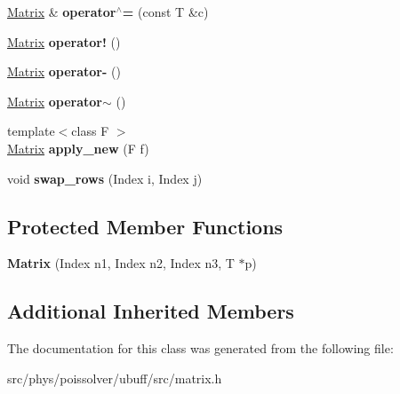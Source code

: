 \begin{DoxyCompactItemize}
\item 
\hyperlink{classcpt_1_1Matrix}{Matrix} \& {\bfseries operator$^\wedge$=} (const T \&c)\hypertarget{classcpt_1_1Matrix_3_01T_00_013_01_4_aa38523b0c9398a42bc5a9ea58c4626fb}{}\label{classcpt_1_1Matrix_3_01T_00_013_01_4_aa38523b0c9398a42bc5a9ea58c4626fb}

\item 
\hyperlink{classcpt_1_1Matrix}{Matrix} {\bfseries operator!} ()\hypertarget{classcpt_1_1Matrix_3_01T_00_013_01_4_ac4f4b53184e0430c49924bcde42842a2}{}\label{classcpt_1_1Matrix_3_01T_00_013_01_4_ac4f4b53184e0430c49924bcde42842a2}

\item 
\hyperlink{classcpt_1_1Matrix}{Matrix} {\bfseries operator-\/} ()\hypertarget{classcpt_1_1Matrix_3_01T_00_013_01_4_a0d4c26db9fe8a5b786dd71db45821e33}{}\label{classcpt_1_1Matrix_3_01T_00_013_01_4_a0d4c26db9fe8a5b786dd71db45821e33}

\item 
\hyperlink{classcpt_1_1Matrix}{Matrix} {\bfseries operator$\sim$} ()\hypertarget{classcpt_1_1Matrix_3_01T_00_013_01_4_a6cb21f95a3ff1fa1d258eb5dd712f6a4}{}\label{classcpt_1_1Matrix_3_01T_00_013_01_4_a6cb21f95a3ff1fa1d258eb5dd712f6a4}

\item 
{\footnotesize template$<$class F $>$ }\\\hyperlink{classcpt_1_1Matrix}{Matrix} {\bfseries apply\+\_\+new} (F f)\hypertarget{classcpt_1_1Matrix_3_01T_00_013_01_4_aa8cf377e73ed18c095fa8fb7e915a9e0}{}\label{classcpt_1_1Matrix_3_01T_00_013_01_4_aa8cf377e73ed18c095fa8fb7e915a9e0}

\item 
void {\bfseries swap\+\_\+rows} (Index i, Index j)\hypertarget{classcpt_1_1Matrix_3_01T_00_013_01_4_ab538f9399dfd2fe7656d33f0726b8e43}{}\label{classcpt_1_1Matrix_3_01T_00_013_01_4_ab538f9399dfd2fe7656d33f0726b8e43}

\end{DoxyCompactItemize}
\subsection*{Protected Member Functions}
\begin{DoxyCompactItemize}
\item 
{\bfseries Matrix} (Index n1, Index n2, Index n3, T $\ast$p)\hypertarget{classcpt_1_1Matrix_3_01T_00_013_01_4_a1bdb62491c8e06d8b53aec2774a8d4a9}{}\label{classcpt_1_1Matrix_3_01T_00_013_01_4_a1bdb62491c8e06d8b53aec2774a8d4a9}

\end{DoxyCompactItemize}
\subsection*{Additional Inherited Members}


The documentation for this class was generated from the following file\+:\begin{DoxyCompactItemize}
\item 
src/phys/poissolver/ubuff/src/matrix.\+h\end{DoxyCompactItemize}
